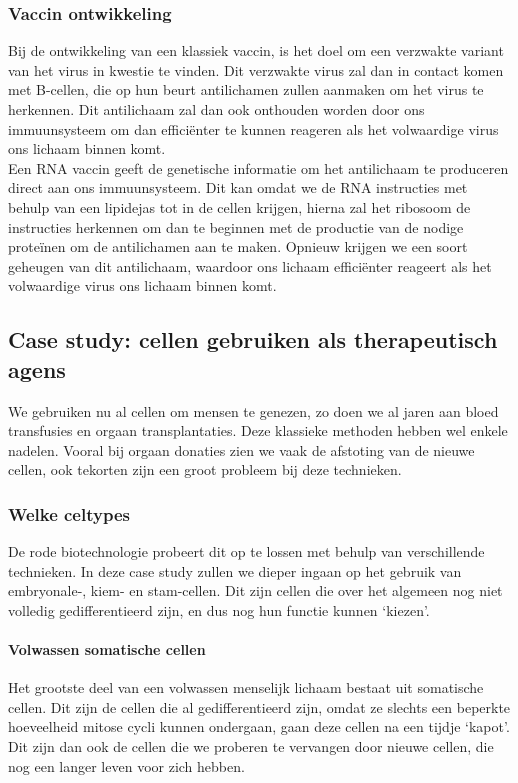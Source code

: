 \documentclass[a4paper,kul]{kulakarticle} %
\begin{document}
\subsubsection{Vaccin ontwikkeling}
Bij de ontwikkeling van een klassiek vaccin, is het doel om een verzwakte variant van het virus in kwestie te vinden. Dit verzwakte virus zal dan in contact komen met B-cellen, die op hun beurt antilichamen zullen aanmaken om het virus te herkennen. Dit antilichaam zal dan ook onthouden worden door ons immuunsysteem om dan efficiënter te kunnen reageren als het volwaardige virus ons lichaam binnen komt. 
\\
Een RNA vaccin geeft de genetische informatie om het antilichaam te produceren direct aan ons immuunsysteem. Dit kan omdat we de RNA instructies met behulp van een lipidejas tot in de cellen krijgen, hierna zal het ribosoom  de instructies herkennen om dan te beginnen met de productie van de nodige proteïnen om de antilichamen aan te maken. Opnieuw krijgen we een soort geheugen van dit antilichaam, waardoor  ons lichaam efficiënter reageert als het volwaardige virus ons lichaam binnen komt.
\subsection[Case study]{Case study: cellen gebruiken als therapeutisch agens}
We gebruiken nu al cellen om mensen te genezen, zo doen we al jaren aan bloed transfusies en orgaan transplantaties. Deze klassieke methoden hebben wel enkele nadelen. Vooral bij orgaan donaties zien we vaak de afstoting van de nieuwe cellen, ook tekorten zijn een groot probleem bij deze technieken. 
\subsubsection{Welke celtypes}
De rode biotechnologie probeert dit op te lossen met behulp van verschillende technieken. In deze case study zullen we dieper ingaan op het gebruik van embryonale-, kiem- en stam-cellen. Dit zijn cellen die over het algemeen nog niet volledig gedifferentieerd zijn, en dus nog hun functie kunnen `kiezen'.
\paragraph{Volwassen somatische cellen}
Het grootste deel van een volwassen menselijk lichaam bestaat uit somatische cellen. Dit zijn de cellen die al gedifferentieerd zijn, omdat ze slechts een beperkte hoeveelheid mitose cycli kunnen ondergaan, gaan deze cellen na een tijdje `kapot'. Dit zijn dan ook de cellen die we proberen te vervangen door nieuwe cellen, die nog een langer leven voor zich hebben. 
\end{document}
